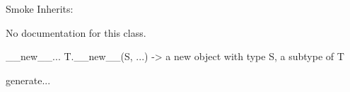 \begin{classdesc*}{Smoke}
Inherits:

No documentation for this class.

\begin{methoddesc}{__new__}{...}
T.\_\_new\_\_(S, ...) -> a new object with type S, a subtype of T
\end{methoddesc}

\begin{methoddesc}{generate}{...}
\end{methoddesc}

\end{classdesc*}

